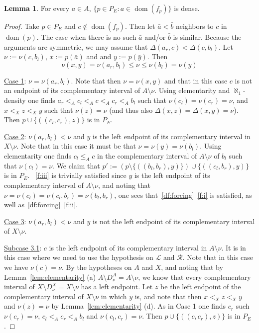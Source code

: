 \documentclass[10pt]{amsart}
\theoremstyle{definition}
\newtheorem{lemma}[theorem]{Lemma}
\theoremstyle{remark}
\newcommand{\setm}{\setminus}
\renewcommand{\L}{\mathscr{L}}
\newcommand{\R}{\mathscr{R}}
\newcommand{\1}{\mathbbm{1}}
\DeclareMathOperator{\dom}{dom}
\begin{document}
\begin{lemma}
  For every $a \in A$,
  $\{p \in P_{E} : a \in \dom(f_{p})\}$ is dense.
\end{lemma}
\begin{proof}
  Take $p \in P_{E}$ and $c \notin \dom(f_{p})$.
  Then let $\bar{a} < \bar{b}$ neighbors to $c$ in $\dom(p)$. The
  case when there is no such $\bar{a}$ and/or $\bar{b}$ is similar.
  Because the arguments are symmetric, we may assume
  that $\Delta(a_{r},c) < \Delta(c,b_{l})$. Let $\nu := \nu(c,b_{l})$,
  $x := p(\bar{a})$ and and $y := p(\bar{y})$.
  Then
  \[\nu(x,y) = \nu(a_{r},b_{l}) \le \nu \le \nu(b_{l})
    = \nu(y)\]

  \underline{Case 1}: $\nu = \nu(a_{r},b_{l})$. Note that then
  $\nu = \nu(x,y)$ and that in this case $c$ is not
  an endpoint of its complementary interval of $A \setm \nu$.
  Using elementarity
  and $\aleph_{1}$-density one finds $a_{r}<_{A}c_{l} <_{A} c <_{A} c_{r} <_{A} b_{l}$
  such that $\nu(c_{l})=\nu(c_{r}) = \nu$, and $x <_{X} z <_{X} y$ such that
  $\nu(z) = \nu$ (and thus also $\Delta(x,z) = \Delta(x,y) = \nu$).
  Then $p \cup \{((c_{l},c_{r}),z)\}$ is in $P_E$.

  \underline{Case 2}: $\nu(a_{r},b_{l}) < \nu$ and $y$ is
  the left endpoint of its complementary interval in $X \setm \nu$.
  Note that in this case it must be that $\nu = \nu(y) = \nu(b_{l})$.
  Using elementarity one finds $c_{l} \le_{A} c$ in the complementary interval
  of $A \setm \nu$ of $b_{l}$ such that $\nu(c_{l}) = \nu$. We claim that
  $p' := (p \setm \{((b_{l},b_{r}),y)\}) \cup \{((c_{l},b_{r}),y)\}$ is in $P_E$.
  ~\ref{f:iii} is trivially satisfied since $y$ is the left
  endpoint of its complementary interval of $A \setm \nu$, and noting that
  $\nu = \nu(c_{l}) = \nu(c_{l},b_{r}) = \nu(b_{l},b_{r})$, one sees
  that~\ref{df:forcing}~\ref{f:i} is satisfied, as well as~\ref{df:forcing}~\ref{f:ii}.

  \underline{Case 3}: $\nu(a_{r},b_{l}) < \nu$ and $y$ is
  not the left endpoint of its complementary interval of $X \setm \nu$.

  \underline{Subcase 3.1}: $c$ is the left endpoint of its complementary interval in $A \setm \nu$. It is in this case where we need to use the hypothesis on
  $\L$ and $\R$. Note that in this case we have $\nu(c) = \nu$.
  By the hypotheses on $A$ and $X$, and noting
  that by Lemma~\ref{lem:elementarity} (a) $A \setm D_{\nu}^{A} = A\setm\nu$, we know
  that every complementary interval
  of $X \setm D_{\nu}^{X} = X \setm \nu$ has a left endpoint. Let $z$ be the left endpoint of
  the complementary interval of $X \setm \nu$ in which $y$ is, and note that then
  $x <_{X} z <_{X} y$ and $\nu(z) = \nu$ by Lemma~\ref{lem:elementarity} (d).
  As in Case 1 one finds
  $c_{r}$ such $\nu(c_{r}) = \nu$, $c_{l} <_{A} c_{r} <_{A} b_{l}$ and
  $\nu(c_{l},c_{r}) = \nu$. Then  $p \cup \{((c,c_{r}),z)\}$ is in $P_E$.


\end{proof}
\end{document}
